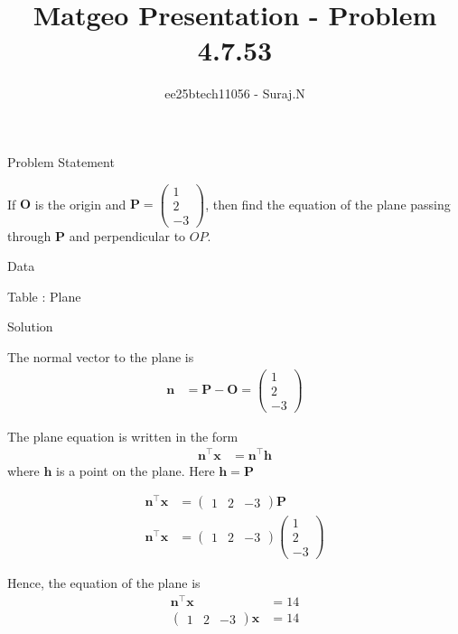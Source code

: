 \documentclass{beamer}
\title{Matgeo Presentation - Problem 4.7.53}
\author{ee25btech11056 - Suraj.N}
\numberwithin{equation}{section}
\theoremstyle{remark}
\newcommand{\myvec}[1]{\ensuremath{\begin{pmatrix}#1\end{pmatrix}}}
\let\vec\mathbf
\begin{document}
\begin{frame}
  \titlepage
\end{frame}

\begin{frame}{Problem Statement}

If $\vec{O}$ is the origin and $\vec{P}=\myvec{1\\2\\-3}$, then find the equation of the plane passing through $\vec{P}$ and perpendicular to $OP$.
 
\end{frame}

\begin{frame}{Data}

\begin{table}[h!]
  \centering
  
  \caption*{Table : Plane}
  \label{4.7.53}
\end{table}

\end{frame}

\begin{frame}{Solution}

The normal vector to the plane is
\begin{align}
\vec{n} &= \vec{P}-\vec{O} = \myvec{1\\2\\-3}
\end{align}

The plane equation is written in the form
\begin{align}
\vec{n}^\top \vec{x} &= \vec{n}^\top \vec{h}
\end{align}
where $\vec{h}$ is a point on the plane. Here $\vec{h}=\vec{P}$

\begin{align}
\vec{n}^\top \vec{x} &= \myvec{1 & 2 & -3}\vec{P} \\
\vec{n}^\top \vec{x} &= \myvec{1 & 2 & -3}\myvec{1\\2\\-3}
\end{align}

\end{frame}

\begin{frame}

Hence, the equation of the plane is
\begin{align}
\vec{n}^\top \vec{x} &= 14 \\
\myvec{1 & 2 & -3}\vec{x} &= 14
\end{align}

\end{frame}
\end{document}
